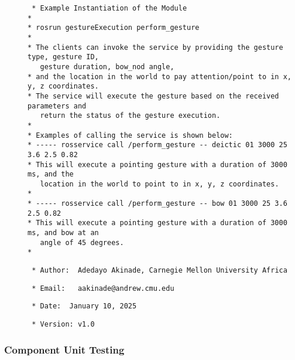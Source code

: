 \documentclass{CSSRforAfrica}
\newcommand{\checkboxChecked}{\fbox{\ding{51}}} %
\begin{document}
\begin{description}
\item[\checkboxChecked] 
 {\small 
\begin{verbatim}
 * Example Instantiation of the Module
*
* rosrun gestureExecution perform_gesture
*
* The clients can invoke the service by providing the gesture type, gesture ID, 
   gesture duration, bow_nod angle, 
* and the location in the world to pay attention/point to in x, y, z coordinates.
* The service will execute the gesture based on the received parameters and 
   return the status of the gesture execution.
*
* Examples of calling the service is shown below:
* ----- rosservice call /perform_gesture -- deictic 01 3000 25 3.6 2.5 0.82
* This will execute a pointing gesture with a duration of 3000 ms, and the 
   location in the world to point to in x, y, z coordinates.
*
* ----- rosservice call /perform_gesture -- bow 01 3000 25 3.6 2.5 0.82
* This will execute a pointing gesture with a duration of 3000 ms, and bow at an 
   angle of 45 degrees.
*
\end{verbatim}}

\item[\checkboxChecked] 
 {\small 
\begin{verbatim}
 * Author:  Adedayo Akinade, Carnegie Mellon University Africa
\end{verbatim}}

\item[\checkboxChecked] 
 {\small 
\begin{verbatim}
 * Email:   aakinade@andrew.cmu.edu
\end{verbatim}}

\item[\checkboxChecked] 
 {\small 
\begin{verbatim}
 * Date:  January 10, 2025
\end{verbatim}}

\item[\checkboxChecked] 
 {\small 
\begin{verbatim}
 * Version: v1.0
\end{verbatim}}


\end{description}


\subsubsection{Component Unit Testing}
\label{subsubsection:gesture_execution_unit_testing}
\end{document}
